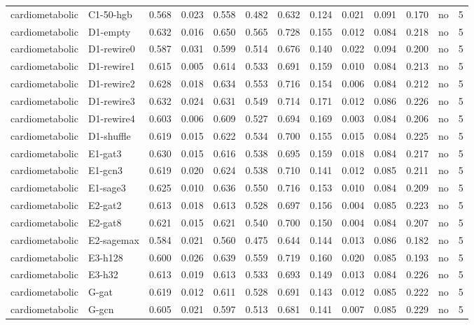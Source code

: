 \begin{table}[t]
\begin{tabular}{lllllllllllll}
cardiometabolic & C1-50-hgb & 0.568 & 0.023 & 0.558 & 0.482 & 0.632 & 0.124 & 0.021 & 0.091 & 0.170 & no & 5 \\
cardiometabolic & D1-empty & 0.632 & 0.016 & 0.650 & 0.565 & 0.728 & 0.155 & 0.012 & 0.084 & 0.218 & no & 5 \\
cardiometabolic & D1-rewire0 & 0.587 & 0.031 & 0.599 & 0.514 & 0.676 & 0.140 & 0.022 & 0.094 & 0.200 & no & 5 \\
cardiometabolic & D1-rewire1 & 0.615 & 0.005 & 0.614 & 0.533 & 0.691 & 0.159 & 0.010 & 0.084 & 0.213 & no & 5 \\
cardiometabolic & D1-rewire2 & 0.628 & 0.018 & 0.634 & 0.553 & 0.716 & 0.154 & 0.006 & 0.084 & 0.212 & no & 5 \\
cardiometabolic & D1-rewire3 & 0.632 & 0.024 & 0.631 & 0.549 & 0.714 & 0.171 & 0.012 & 0.086 & 0.226 & no & 5 \\
cardiometabolic & D1-rewire4 & 0.603 & 0.006 & 0.609 & 0.527 & 0.694 & 0.169 & 0.003 & 0.084 & 0.206 & no & 5 \\
cardiometabolic & D1-shuffle & 0.619 & 0.015 & 0.622 & 0.534 & 0.700 & 0.155 & 0.015 & 0.084 & 0.225 & no & 5 \\
cardiometabolic & E1-gat3 & 0.630 & 0.015 & 0.616 & 0.538 & 0.695 & 0.159 & 0.018 & 0.084 & 0.217 & no & 5 \\
cardiometabolic & E1-gcn3 & 0.619 & 0.020 & 0.624 & 0.538 & 0.710 & 0.141 & 0.012 & 0.085 & 0.211 & no & 5 \\
cardiometabolic & E1-sage3 & 0.625 & 0.010 & 0.636 & 0.550 & 0.716 & 0.153 & 0.010 & 0.084 & 0.209 & no & 5 \\
cardiometabolic & E2-gat2 & 0.613 & 0.018 & 0.613 & 0.528 & 0.697 & 0.156 & 0.004 & 0.085 & 0.223 & no & 5 \\
cardiometabolic & E2-gat8 & 0.621 & 0.015 & 0.621 & 0.540 & 0.700 & 0.150 & 0.004 & 0.084 & 0.207 & no & 5 \\
cardiometabolic & E2-sagemax & 0.584 & 0.021 & 0.560 & 0.475 & 0.644 & 0.144 & 0.013 & 0.086 & 0.182 & no & 5 \\
cardiometabolic & E3-h128 & 0.600 & 0.026 & 0.639 & 0.559 & 0.719 & 0.160 & 0.020 & 0.085 & 0.193 & no & 5 \\
cardiometabolic & E3-h32 & 0.613 & 0.019 & 0.613 & 0.533 & 0.693 & 0.149 & 0.013 & 0.084 & 0.226 & no & 5 \\
cardiometabolic & G-gat & 0.619 & 0.012 & 0.611 & 0.528 & 0.691 & 0.143 & 0.012 & 0.085 & 0.222 & no & 5 \\
cardiometabolic & G-gcn & 0.605 & 0.021 & 0.597 & 0.513 & 0.681 & 0.141 & 0.007 & 0.085 & 0.229 & no & 5 \\

\end{tabular}
\end{table}
